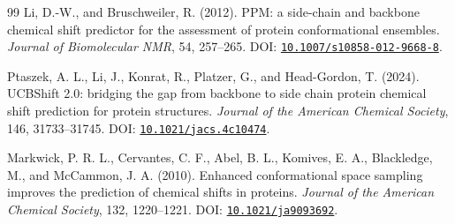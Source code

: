 \documentclass[11pt]{article}
\newcommand{\doi}[1]{\href{https://doi.org/#1}{\nolinkurl{#1}}}
\begin{document}
\begin{thebibliography}{99}
Li, D.-W., and Bruschweiler, R. (2012).
PPM: a side-chain and backbone chemical shift predictor for the assessment of
protein conformational ensembles.
\emph{Journal of Biomolecular NMR}, 54, 257--265.
DOI: \doi{10.1007/s10858-012-9668-8}.

Ptaszek, A. L., Li, J., Konrat, R., Platzer, G., and Head-Gordon, T. (2024).
UCBShift 2.0: bridging the gap from backbone to side chain protein chemical
shift prediction for protein structures.
\emph{Journal of the American Chemical Society}, 146, 31733--31745.
DOI: \doi{10.1021/jacs.4c10474}.

Markwick, P. R. L., Cervantes, C. F., Abel, B. L., Komives, E. A.,
Blackledge, M., and McCammon, J. A. (2010).
Enhanced conformational space sampling improves the prediction of chemical
shifts in proteins.
\emph{Journal of the American Chemical Society}, 132, 1220--1221.
DOI: \doi{10.1021/ja9093692}.

\end{thebibliography}
\end{document}
